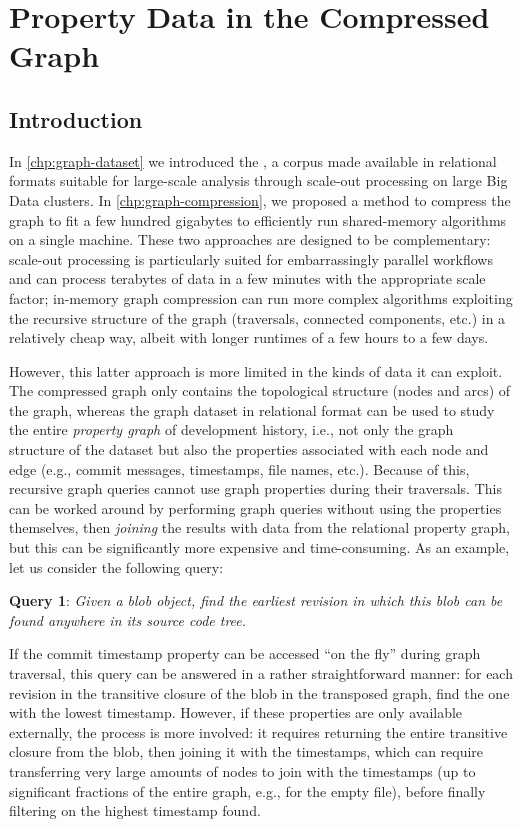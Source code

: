 \chapter{Property Data in the Compressed Graph}%
\label{chp:graph-metadata}

\section{Introduction}

In \cref{chp:graph-dataset} we introduced the \SWHGD{}, a corpus made available
in relational formats suitable for large-scale analysis through scale-out
processing on large Big Data clusters.
In \cref{chp:graph-compression}, we proposed a method to compress the graph to
fit a few hundred gigabytes to efficiently run shared-memory algorithms on a
single machine.
These two approaches are designed to be complementary: scale-out processing is
particularly suited for embarrassingly parallel workflows and can process
terabytes of data in a few minutes with the appropriate scale factor; in-memory
graph compression can run more complex algorithms exploiting the recursive
structure of the graph (traversals, connected components, etc.) in a relatively
cheap way, albeit with longer runtimes of a few hours to a few days.

However, this latter approach is more limited in the kinds of data it can
exploit. The compressed graph only contains the topological structure (nodes
and arcs) of the graph, whereas the graph dataset in relational format can be
used to study the entire \emph{property graph} of development history, i.e.,
not only the graph structure of the dataset but also the properties associated
with each node and edge (e.g., commit messages, timestamps, file names, etc.).
Because of this, recursive graph queries cannot use graph properties during
their traversals. This can be worked around by performing graph queries
without using the properties themselves, then \emph{joining} the results with
data from the relational property graph, but this can be significantly more
expensive and time-consuming.
As an example, let us consider the following query:

\textbf{Query 1}: \emph{Given a blob object, find the earliest revision in
which this blob can be found anywhere in its source code tree.}

If the commit timestamp property can be accessed ``on the fly'' during graph
traversal, this query can be answered in a rather straightforward manner: for
each revision in the transitive closure of the blob in the transposed graph,
find the one with the lowest timestamp. However, if these properties are only
available externally, the process is more involved: it requires returning the
entire transitive closure from the blob, then joining it with the timestamps,
which can require transferring very large amounts of nodes to join with the
timestamps (up to significant fractions of the entire graph, e.g., for the
empty file), before finally filtering on the highest timestamp found.

